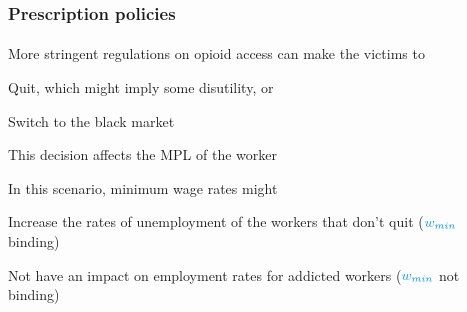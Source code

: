 \begin{frame}

    \frametitle{Prescription policies} %
    \framesubtitle{}  %
    \rmfamily %
    
    \begin{wideitemize}
        \item More stringent regulations on opioid access can make the victims to 
        \vspace{9pt}
        \begin{wideitemize}
            \item[\textcolor{fblu}{\textbullet}] \textcolor{fblu}{Quit}, which might imply some disutility, or
            \item[\textcolor{fblu}{\textbullet}] \textcolor{fblu}{Switch to the black market}
        \end{wideitemize}
        \item This decision affects the MPL of the worker
        \item In this scenario, minimum wage rates might
        \vspace{9pt}
        \begin{wideitemize}
            \item[\textcolor{fblu}{\textbullet}] Increase the rates of unemployment of the workers that don't quit (\(\textcolor{fblu}{w_{min}}\) \textcolor{fblu}{binding})
            \item[\textcolor{fblu}{\textbullet}] Not have an impact on employment rates for addicted workers (\(\textcolor{fblu}{w_{min}}\) \textcolor{fblu}{not binding})
        \end{wideitemize}
    \end{wideitemize}
    
\end{frame}


